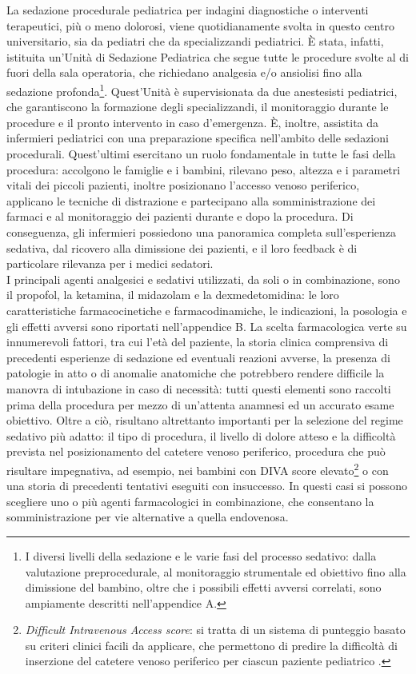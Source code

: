 La sedazione procedurale pediatrica per indagini diagnostiche o interventi terapeutici, più o meno dolorosi, viene quotidianamente svolta in questo centro universitario, sia da pediatri che da specializzandi pediatrici. \`E stata, infatti, istituita un'Unità di Sedazione Pediatrica che segue tutte le procedure svolte al di fuori della sala operatoria, che richiedano analgesia e/o ansiolisi fino alla sedazione profonda\footnote{I diversi livelli della sedazione e le varie fasi del processo sedativo: dalla valutazione preprocedurale, al monitoraggio strumentale ed obiettivo fino alla dimissione del bambino, oltre che i possibili effetti avversi correlati, sono ampiamente descritti nell'appendice A.}. Quest'Unità è supervisionata da due anestesisti pediatrici, che garantiscono la formazione degli specializzandi, il monitoraggio durante le procedure e il pronto intervento in caso d'emergenza. \`E, inoltre, assistita da infermieri pediatrici con una preparazione specifica nell'ambito delle sedazioni procedurali. Quest'ultimi esercitano un ruolo fondamentale in tutte le fasi della procedura: accolgono le famiglie e i bambini, rilevano peso, altezza e i parametri vitali dei piccoli pazienti, inoltre posizionano l'accesso venoso periferico, applicano le tecniche di distrazione e partecipano alla somministrazione dei farmaci e al monitoraggio dei pazienti durante e dopo la procedura. Di conseguenza, gli infermieri possiedono una panoramica completa sull'esperienza sedativa, dal ricovero alla dimissione dei pazienti, e il loro feedback è di particolare rilevanza per i medici sedatori. 
\\I principali agenti analgesici e sedativi utilizzati, da soli o in combinazione, sono il propofol, la ketamina, il midazolam e la dexmedetomidina: le loro caratteristiche farmacocinetiche e farmacodinamiche, le indicazioni, la posologia e gli effetti avversi sono riportati nell'appendice B. La scelta farmacologica verte su innumerevoli fattori, tra cui l'età del paziente, la storia clinica comprensiva di precedenti esperienze di sedazione ed eventuali reazioni avverse, la presenza di patologie in atto o di anomalie anatomiche che potrebbero rendere difficile la manovra di intubazione in caso di necessità: tutti questi elementi sono raccolti prima della procedura per mezzo di un'attenta anamnesi ed un accurato esame obiettivo. Oltre a ciò, risultano altrettanto importanti per la selezione del regime sedativo più adatto: il tipo di procedura, il livello di dolore atteso e la difficoltà prevista nel posizionamento del catetere venoso periferico, procedura che può risultare impegnativa, ad esempio, nei bambini con DIVA score elevato\footnote{\emph{Difficult Intravenous Access score}: si tratta di un sistema di punteggio basato su criteri clinici facili da applicare, che permettono di predire la difficoltà di inserzione del catetere venoso periferico per ciascun paziente pediatrico \cite{Yen2008}.} o con una storia di precedenti tentativi eseguiti con insuccesso. In questi casi si possono scegliere uno o più agenti farmacologici in combinazione, che consentano la somministrazione per vie alternative a quella endovenosa. 
